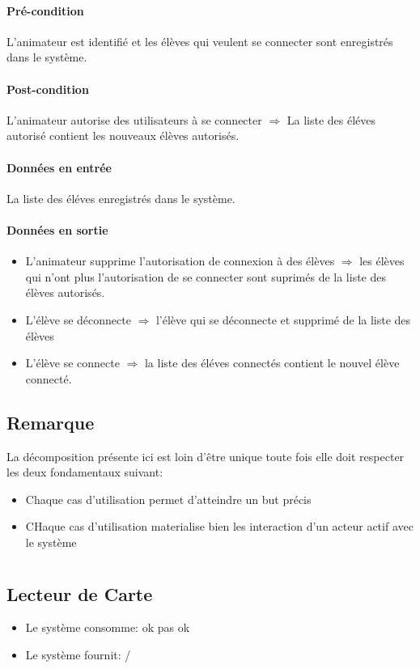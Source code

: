 \documentclass{article}
\begin{document}
		\paragraph{Pré-condition}
		L'animateur est identifié et les élèves qui veulent se connecter sont enregistrés dans le 
		système.
		\paragraph{Post-condition}
		L'animateur autorise des utilisateurs à se connecter $\Rightarrow$ La liste des éléves
		autorisé contient les nouveaux élèves autorisés. 
		\paragraph{Données en entrée}
		La liste des éléves enregistrés dans le système.
		\paragraph{Données en sortie}
		\begin{itemize}
			\item L'animateur supprime l'autorisation de connexion à des élèves $\Rightarrow$ 
				les élèves qui n'ont plus l'autorisation de se connecter sont suprimés de la liste 
				des élèves autorisés.
			\item L'élève se déconnecte $\Rightarrow$ l'élève qui se déconnecte et supprimé
				de la liste des élèves
			\item L'élève se connecte $\Rightarrow$ la liste des éléves connectés contient le nouvel 
				élève connecté.
		\end{itemize}
		\subsection{Remarque}
		La décomposition présente ici est loin d'être unique toute fois elle doit respecter les deux fondamentaux suivant: 
		\begin{itemize}
			\item Chaque cas d'utilisation permet d'atteindre un but précis
			\item CHaque cas d'utilisation materialise bien les interaction d'un acteur actif avec le système
		\end{itemize}
		\section{}
		\subsection{Lecteur de Carte}
		\begin{itemize}
			\item Le système consomme: ok pas ok
			\item Le système fournit: / 
		\end{itemize}
\end{document}

